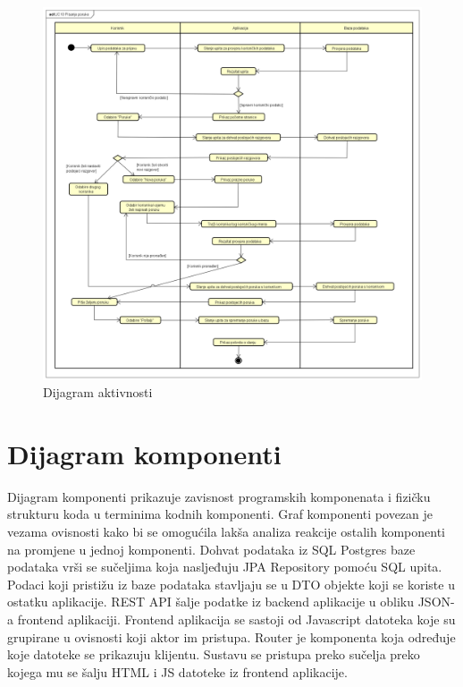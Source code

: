 	\begin{figure}[H]
		\begin{center}
			\includegraphics[width=17cm]{slike/dijagram_aktivnosti.PNG}
		\end{center}
		\caption{Dijagram aktivnosti}
		\label{fig:dijakt}
	\end{figure}
	
	\eject
	
	
	
	\section{Dijagram komponenti}
	
	Dijagram komponenti prikazuje zavisnost programskih komponenata i fizičku strukturu koda u terminima kodnih komponenti. Graf komponenti povezan je vezama ovisnosti kako bi se omogućila lakša analiza reakcije ostalih komponenti na promjene u jednoj komponenti. 
	Dohvat podataka iz SQL Postgres baze podataka vrši se sučeljima koja nasljeđuju JPA Repository pomoću SQL upita. Podaci koji pristižu iz baze podataka stavljaju se u DTO objekte koji se koriste u ostatku aplikacije. REST API šalje podatke iz backend aplikacije u obliku JSON-a frontend aplikaciji. Frontend aplikacija se sastoji od Javascript datoteka koje su grupirane u ovisnosti koji aktor im pristupa. Router je komponenta koja određuje koje datoteke se prikazuju klijentu. Sustavu se pristupa preko sučelja preko kojega mu se šalju HTML i JS datoteke iz frontend aplikacije.
	
